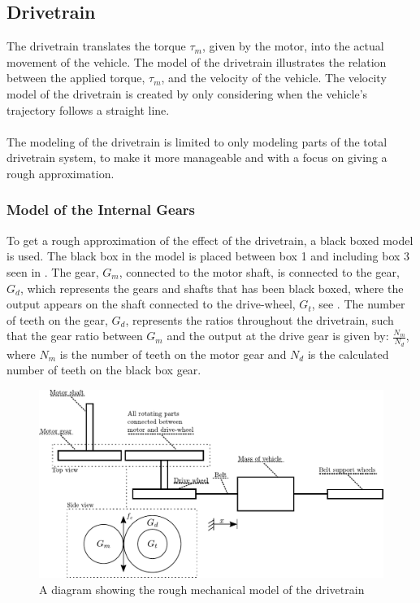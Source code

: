 \subsection{Drivetrain}\label{Drivetrain}
The drivetrain translates the torque $\tau_m$, given by the motor, into the actual movement of the vehicle. The model of the drivetrain illustrates the relation between the applied torque, $\tau_m$, and the velocity of the vehicle. The velocity model of the drivetrain is created by only considering when the vehicle's trajectory follows a straight line.\\\\
%
The modeling of the drivetrain is limited to only modeling parts of the total drivetrain system, to make it more manageable and with a focus on giving a rough approximation.

\subsubsection{Model of the Internal Gears}\label{BlackBoxModel}
To get a rough approximation of the effect of the drivetrain, a black boxed model is used. The black box in the model is placed between box 1 and including box 3 seen in  . The gear, $G_m$, connected to the motor shaft, is connected to the gear, $G_d$, which represents the gears and shafts that has been black boxed, where the output appears on the shaft connected to the drive-wheel, $G_t$, see . The number of teeth on the gear, $G_d$, represents the ratios throughout the drivetrain, such that the gear ratio between $G_m$ and the output at the drive gear is given by: $\frac{N_m}{N_d}$, where $N_m$ is the number of teeth on the motor gear and $N_d$ is the calculated number of teeth on the black box gear.

\begin{figure}[H]
	\centering
	\includegraphics[scale=0.8]{figures/mechanicalDrawingSystem.pdf}
	\caption{A diagram showing the rough mechanical model of the drivetrain}
	\label{fig:DrivetrainMechanicalModel}
\end{figure}

